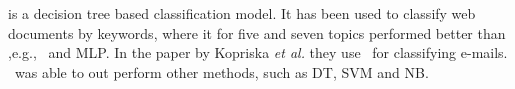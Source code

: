 \rf is a decision tree based classification model. It has been used to classify web documents by keywords, where it for five and seven topics performed better than ,e.g., \nb\ and MLP. In the paper by Kopriska \emph{et al.} they use \rf\ for classifying e-mails. \rf\ was able to out perform other methods, such as DT, SVM and NB. \cite{keywords}\cite{email}